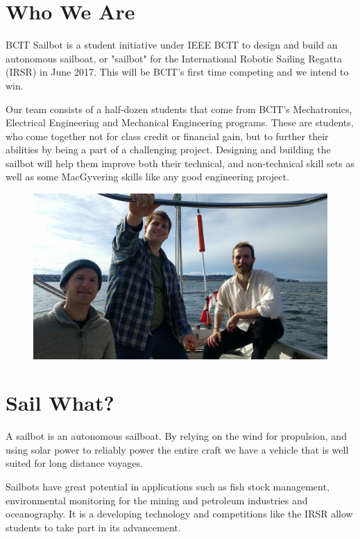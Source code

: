 \documentclass{article}
\begin{document}


\section*{Who We Are}
BCIT Sailbot is a student initiative under IEEE BCIT to design and build an
autonomous sailboat, or "sailbot" for the International Robotic Sailing Regatta 
(IRSR) in June 2017. This will be BCIT's first time competing and we intend to 
win. 

Our team consists of a half-dozen students that come from BCIT's Mechatronics,
Electrical Engineering and Mechanical Engineering programs. These are students, 
who come together not for class credit or financial gain, but to further their 
abilities by being a part of a challenging project. Designing and building the 
sailbot will help them improve both their technical, and non-technical skill 
sets as well as some MacGyvering skills like any good engineering project.

\begin{figure}[H]
    \centering
    \includegraphics[scale=0.1]{Sailing.jpg}
\end{figure}

\newpage

\section*{Sail What?}
A sailbot is an autonomous sailboat. By relying on the wind for propulsion, and 
using solar power to reliably power the entire craft we have a vehicle that is
well suited for long distance voyages.

Sailbots have great potential in applications such as fish stock management, 
environmental monitoring for the mining and petroleum industries and 
oceanography. It is a developing technology and competitions like the IRSR allow
students to take part in its advancement.
\end{document}

